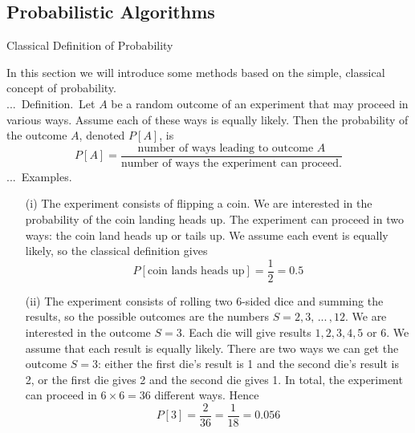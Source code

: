 \documentclass[smaller,hyperref={CJKbookmarks=true}]{beamer}
\newcounter{zhuo}[subsection]
\renewcommand{\thezhuo}{\thesection.\thesubsection.\arabic{zhuo}}
\newenvironment{DEFINITION}{\stepcounter{zhuo}\alert{\thezhuo.~Definition.\,}}{}
\newenvironment{EXAMPLES}{\stepcounter{zhuo}\alert{\!\thezhuo.~Examples.\,}}{}
\begin{document}
\subsection{Probabilistic Algorithms}
\begin{frame}[c] \begin{spacing}{2.5}
\tableofcontents[sectionstyle=hide,subsectionstyle=show/shaded/hide] \end{spacing}
\end{frame}
\begin{frame}{Classical Definition of Probability}
\begin{spacing}{0.9}
In this section we will introduce some methods based on the simple,
classical concept of probability.\\[5pt]
\setcounter{equation}{0}
\begin{DEFINITION}
Let $A$ be a random outcome of an experiment that may
proceed in various ways. Assume each of these ways is equally likely. Then
the probability of the outcome $A$, denoted $P[A]$, is
\[P[A]=\frac{\text{number of ways leading to outcome }A}{\text{number of ways the experiment can proceed.}}\]
\begin{EXAMPLES}
\begin{itemize}
  \item[(i)] The experiment consists of flipping a coin. We are interested in the probability of the coin landing heads up. The experiment can proceed in two ways: the coin land heads up or tails up. We assume each event is equally likely, so the classical definition gives
      \[P[\text{coin lands heads up}]=\frac{1}{2}=0.5\]
\newpage
  \item[(ii)] The experiment consists of rolling two 6-sided dice and summing the results, so the possible outcomes are the numbers $S=2,3,\,...\,,12$. We are interested in the outcome $S=3$. Each die will give results $1,2,3,4,5$ or 6. We assume that each result is equally likely. There are two ways we can get the outcome $S = 3$: either the first die's result is 1 and the second die's result is 2, or the first die gives 2 and the second die gives 1. In total, the experiment can proceed in $6\times 6=36$ different ways. Hence
      \[P[3]=\frac{2}{36}=\frac{1}{18}=0.056\]
\end{itemize}
\end{EXAMPLES}
\end{DEFINITION}
\end{spacing}
\end{frame}
\end{document}
